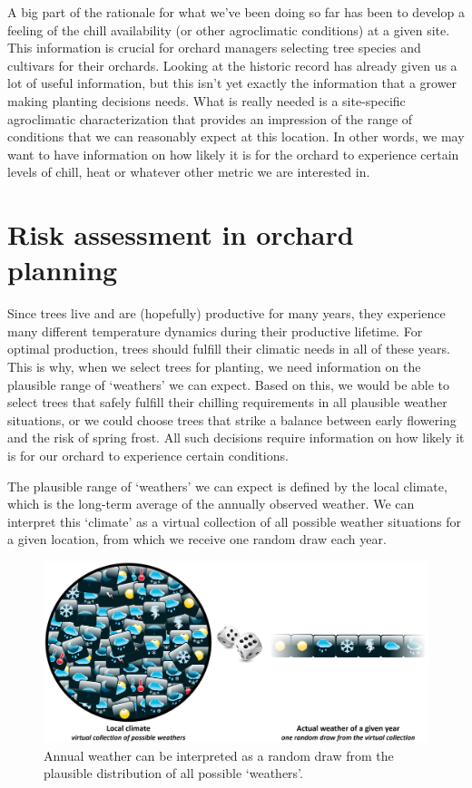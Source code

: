 \documentclass[
]{book}
\begin{document}
A big part of the rationale for what we've been doing so far has been to develop a feeling of the chill availability (or other agroclimatic conditions) at a given site. This information is crucial for orchard managers selecting tree species and cultivars for their orchards. Looking at the historic record has already given us a lot of useful information, but this isn't yet exactly the information that a grower making planting decisions needs. What is really needed is a site-specific agroclimatic characterization that provides an impression of the range of conditions that we can reasonably expect at this location. In other words, we may want to have information on how likely it is for the orchard to experience certain levels of chill, heat or whatever other metric we are interested in.

\hypertarget{risk-assessment-in-orchard-planning}{%
\section{Risk assessment in orchard planning}\label{risk-assessment-in-orchard-planning}}

Since trees live and are (hopefully) productive for many years, they experience many different temperature dynamics during their productive lifetime. For optimal production, trees should fulfill their climatic needs in all of these years. This is why, when we select trees for planting, we need information on the plausible range of `weathers' we can expect. Based on this, we would be able to select trees that safely fulfill their chilling requirements in all plausible weather situations, or we could choose trees that strike a balance between early flowering and the risk of spring frost. All such decisions require information on how likely it is for our orchard to experience certain conditions.

The plausible range of `weathers' we can expect is defined by the local climate, which is the long-term average of the annually observed weather. We can interpret this `climate' as a virtual collection of all possible weather situations for a given location, from which we receive one random draw each year.

\begin{figure}
\centering
\includegraphics{pictures/climate_weather.png}
\caption{Annual weather can be interpreted as a random draw from the plausible distribution of all possible `weathers'.}
\end{figure}
\end{document}
